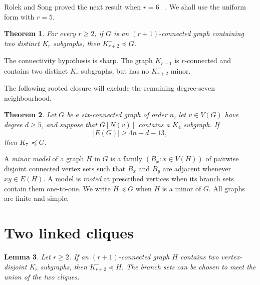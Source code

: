 \documentclass[11pt]{amsart}
\newtheorem{theorem}{Theorem}[section]
\newtheorem{lemma}[theorem]{Lemma}
\newcommand{\minor}{\preccurlyeq}
\newcommand{\N}{N}
\begin{document}
Rolek and Song proved the next result when $r=6$
~\cite[Lemma~1.9]{RolekSong2017}.  We shall use the uniform form with
$r=5$.

\begin{theorem}\label{thm:two-cliques}
For every $r\geq2$, if $G$ is an $(r+1)$-connected graph containing two
distinct $K_r$ subgraphs, then $K_{r+2}^{-}\minor G$.
\end{theorem}

The connectivity hypothesis is sharp.  The graph $K_{r+1}$ is
$r$-connected and contains two distinct $K_r$ subgraphs, but has no
$K_{r+2}^{-}$ minor.

The following rooted closure will exclude the remaining degree-seven
neighbourhood.

\begin{theorem}\label{thm:rooted-closure}
Let $G$ be a six-connected graph of order $n$, let $v\in V(G)$ have degree
$d\geq5$, and suppose that $G[\N(v)]$ contains a $K_4$ subgraph.  If
\[
        |E(G)|\geq4n+d-13,
\]
then $K_7^{-}\minor G$.
\end{theorem}

A \emph{minor model} of a graph $H$ in $G$ is a family
$(B_x:x\in V(H))$ of pairwise disjoint connected vertex sets such that
$B_x$ and $B_y$ are adjacent whenever $xy\in E(H)$.  A model is
\emph{rooted} at prescribed vertices when its branch sets contain them
one-to-one.  We write $H\minor G$ when $H$ is a minor of $G$.  All graphs
are finite and simple.

\section{Two linked cliques}

\begin{lemma}\label{lem:disjoint-cliques}
Let $r\geq2$.  If an $(r+1)$-connected graph $H$ contains two
vertex-disjoint $K_r$ subgraphs, then $K_{r+2}^{-}\minor H$.  The branch
sets can be chosen to meet the union of the two cliques.
\end{lemma}
\end{document}
